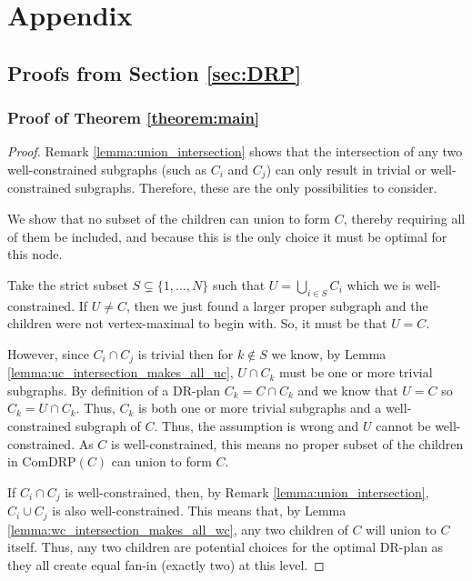 \section{Appendix}
\label{sec:appendix}

\subsection{Proofs from Section \ref{sec:DRP}}

\newcommand{\usestwod}{\todo{Uses 2D requirement:}}
\renewcommand{\usestwod}{}


\subsubsection{Proof of Theorem \ref{theorem:main}}

\begin{proof}
Remark \ref{lemma:union_intersection} shows that the intersection of any two well-constrained subgraphs (such as $C_i$ and $C_j$) can only result in trivial or well-constrained subgraphs. Therefore, these are the only possibilities to consider.

\medskip\noindent
{} We show that no subset of the children can union to form $C$, thereby requiring all of them be included, and because this is the only choice it must be optimal for this node.

Take the strict subset $S\subsetneq \{1,\ldots,N\}$ such that $U=\bigcup_{i\in S}{C_i}$ which we  is well-constrained. If $U\neq C$, then we just found a larger proper subgraph and the children were not vertex-maximal to begin with. So, it must be that $U=C$.
\usestwod
However, since $C_i \cap C_j$ is trivial then for $k\notin S$ we know, by Lemma \ref{lemma:uc_intersection_makes_all_uc}, $U\cap C_k$ must be one or more trivial subgraphs. By definition of a DR-plan $C_k=C\cap C_k$ and we know that $U=C$ so $C_k=U\cap C_k$. Thus, $C_k$ is both one or more trivial subgraphs and a well-constrained subgraph of $C$. Thus, the assumption is wrong and $U$ cannot be well-constrained. As $C$ is well-constrained, this means no proper subset of the children in ComDRP$(C)$ can union to form $C$.

\medskip\noindent
{} If $C_i \cap C_j$ is well-constrained, then, by Remark \ref{lemma:union_intersection}, $C_i \cup C_j$ is also well-constrained. This means that, by Lemma \ref{lemma:wc_intersection_makes_all_wc}, any two children of $C$ will union to $C$ itself. Thus, any two children are potential choices for the optimal DR-plan as they all create equal fan-in (exactly two) at this level.


\end{proof}
